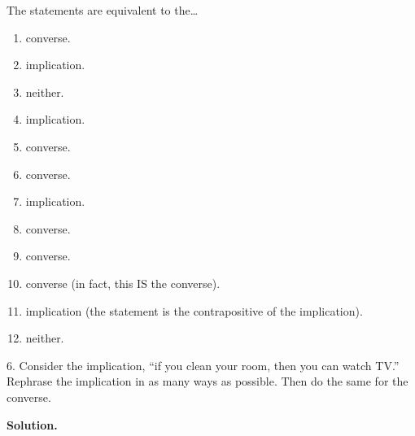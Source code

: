 \documentclass[10pt,]{book}
\theoremstyle{plain}
\theoremstyle{definition}
\theoremstyle{definition}
\theoremstyle{definition}
\numberwithin{equation}{section}
\begin{document}
\begin{exerciselist}
          The statements are equivalent to the\dots{}
\leavevmode%
\begin{enumerate}[label=(\alph*)]
\item\hypertarget{li-115}{} converse. %
\item\hypertarget{li-116}{} implication. %
\item\hypertarget{li-117}{} neither. %
\item\hypertarget{li-118}{} implication. %
\item\hypertarget{li-119}{} converse. %
\item\hypertarget{li-120}{} converse. %
\item\hypertarget{li-121}{} implication. %
\item\hypertarget{li-122}{} converse. %
\item\hypertarget{li-123}{} converse. %
\item\hypertarget{li-124}{} converse (in fact, this IS the converse). %
\item\hypertarget{li-125}{} implication (the statement is the contrapositive of the implication). %
\item\hypertarget{li-126}{} neither. %
\end{enumerate}
\item[6.]\hypertarget{exercise-6}{}
          Consider the implication, ``if you clean your room, then you can watch TV.'' Rephrase the implication in as many ways as possible. Then do the same for the converse.
\par\smallskip
\par\smallskip
\noindent\textbf{Solution.}\hypertarget{solution-12}{}\quad


\end{exerciselist}
\end{document}
